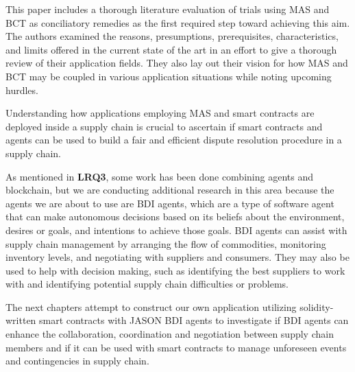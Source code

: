 \begin{itemize}[label={}]
\vspace{.5cm}

This paper\cite{literature} includes a thorough literature evaluation of trials using \ac{MAS} and \ac{BCT} as conciliatory remedies as the first required step toward achieving this aim. The authors examined the reasons, presumptions, prerequisites, characteristics, and limits offered in the current state of the art in an effort to give a thorough review of their application fields. They also lay out their vision for how \ac{MAS} and \ac{BCT} may be coupled in various application situations while noting upcoming hurdles.
\end{itemize}

Understanding how applications employing \ac{MAS} and smart contracts are deployed inside a supply chain is crucial to ascertain if smart contracts and agents can be used to build a fair and efficient dispute resolution procedure in a supply chain. 

\vspace{.5cm}

As mentioned in \textbf{LRQ3}, some work has been done combining agents and blockchain, but we are conducting additional research in this area because the agents we are about to use are \ac{BDI} agents, which are a type of software agent that can make autonomous decisions based on its beliefs about the environment, desires or goals, and intentions to achieve those goals. \ac{BDI} agents can assist with supply chain management by arranging the flow of commodities, monitoring inventory levels, and negotiating with suppliers and consumers. They may also be used to help with decision making, such as identifying the best suppliers to work with and identifying potential supply chain difficulties or problems.

\vspace{.5cm}

The next chapters attempt to construct our own application utilizing solidity-written smart contracts with JASON BDI agents to investigate if \ac{BDI} agents can enhance the collaboration, coordination and negotiation between supply chain members and if it can be used with smart contracts to manage unforeseen events and contingencies in supply chain.